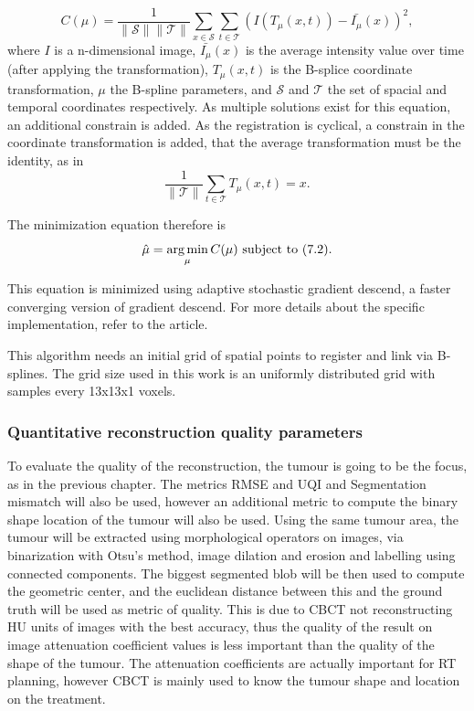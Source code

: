\begin{equation}
C(\mu)=\frac{1}{\lVert \mathcal{S} \rVert\lVert \mathcal{T}\rVert}\sum_{x\in \mathcal{S}} \sum_{t\in\mathcal{T}}\left(I(T_\mu(x,t)) - \bar{I_\mu}(x)\right)^2,
\end{equation}
where $I$ is a n-dimensional image, $\bar{I_\mu}(x)$ is the average intensity value over time (after applying the transformation), $T_\mu(x,t)$ is the B-splice coordinate transformation, $\mu$ the B-spline parameters, and $\mathcal{S}$ and $\mathcal{T}$ the set of spacial and temporal coordinates respectively. As multiple solutions exist for this equation, an additional constrain is added. As the registration is cyclical, a constrain in the coordinate transformation is added, that the average transformation must be the identity, as in
\begin{equation}
\frac{1}{\lVert \mathcal{T}\rVert}\sum_{t\in\mathcal{T}}T_\mu(x,t)=x.
\end{equation}

The minimization equation therefore is
\begin{equation}
\hat{\mu}=\mathop{\mathrm{arg\,min}}_\mu C(\mu) \text{  subject to  } (7.2).
\end{equation}

This equation is minimized using adaptive stochastic gradient descend, a faster converging version of gradient descend\cite{klein2009adaptive}. For more details about the specific implementation, refer to the article\cite{metz2011nonrigid}.

This algorithm needs an initial grid of spatial points to register and link via B-splines. The grid size used in this work is an uniformly distributed grid with samples every 13x13x1 voxels.
\subsubsection{Quantitative reconstruction quality parameters}

To evaluate the quality of the reconstruction, the tumour is going to be the focus, as  in the previous chapter. The metrics RMSE and UQI and Segmentation mismatch will also be used, however an additional metric to compute the binary shape location of the tumour will also be used.  Using the same tumour area, the tumour will be extracted using morphological operators on images, via binarization with Otsu's method, image dilation and erosion and labelling using connected components. The biggest segmented blob will be then used to compute the geometric center, and the euclidean distance between this and the ground truth will be used as metric of quality. This is due to CBCT not reconstructing HU units of images with the best accuracy, thus the quality of the result on image attenuation coefficient values is less important than the quality of the shape of the tumour. The attenuation coefficients are actually important for RT planning, however CBCT is mainly used to know the tumour shape and location on the treatment.




